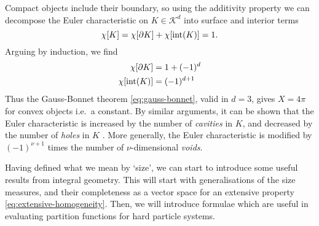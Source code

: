 Compact objects include their boundary, so using the additivity property we can decompose the Euler characteristic on $K \in \mathcal{K}^d$ into surface and interior terms
\begin{equation*}
  \chi[K] = \chi[ \partial K ] + \chi[ \operatorname{int}(K) ] = 1.
\end{equation*}
Arguing by induction, we find%
\begin{subequations}
  \begin{align}
    \chi[ \partial K ] &= 1 + (-1)^d
    \\
    \chi[ \operatorname{int}(K) ] &= (-1)^{d+1}
  \end{align}
\end{subequations}
Thus the Gauss-Bonnet theorem \eqref{eq:gauss-bonnet}, valid in $d=3$, gives $X = 4\pi$ for convex objects i.e.\ a constant.
By similar arguments, it can be shown that the Euler characteristic is increased by the number of \emph{cavities} in $K$, and decreased by the number of \emph{holes} in $K$ \cite{Klain1997}.
More generally, the Euler characteristic is modified by $(-1)^{\nu+1}$ times the number of $\nu$-dimensional \emph{voids}.




Having defined what we mean by `size', we can start to introduce some useful results from integral geometry.
This will start with generalisations of the size measures, and their completeness as a vector space for an extensive property \eqref{eq:extensive-homogeneity}.
Then, we will introduce formulae which are useful in evaluating partition functions for hard particle systems.

